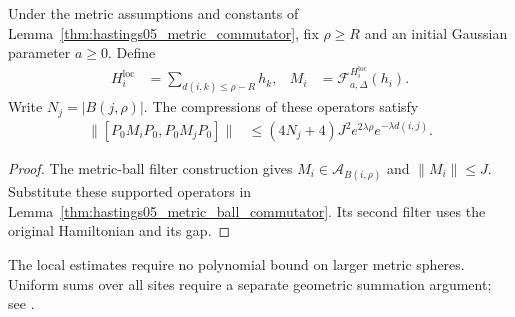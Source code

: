 \begin{lemma}
    \label{thm:hastings05_actual_metric_commutator}
    \leanok
    Under the metric assumptions and constants of
    Lemma~\ref{thm:hastings05_metric_commutator}, fix $\rho\ge R$
    and an initial Gaussian parameter $a\ge0$. Define
    \begin{align}
        H_i^{\mathrm{loc}}&=\sum_{d(i,k)\le\rho-R}h_k,&
        M_i&=\mathcal F^{H_i^{\mathrm{loc}}}_{a,\Delta}(h_i).
        \label{eq:hastings05_actual_metric_terms}
    \end{align}
    Write $N_j=|B(j,\rho)|$. The compressions of these operators satisfy
    \begin{align}
        \|[P_0M_iP_0,P_0M_jP_0]\|
        &\le(4N_j+4)J^2e^{2\lambda\rho}e^{-\lambda d(i,j)}.
        \label{eq:hastings05_actual_metric_commutator}
    \end{align}
\end{lemma}
\begin{proof}\leanok
    The metric-ball filter construction gives
    $M_i\in\mathcal A_{B(i,\rho)}$ and $\|M_i\|\le J$.
    Substitute these supported operators in
    Lemma~\ref{thm:hastings05_metric_ball_commutator}.
    Its second filter uses the original Hamiltonian and its gap.
\end{proof}

The local estimates require no polynomial bound on larger metric spheres.
Uniform sums over all sites require a separate geometric summation
argument; see \cite{gap:hastings05_geometric_growth_scope}.
